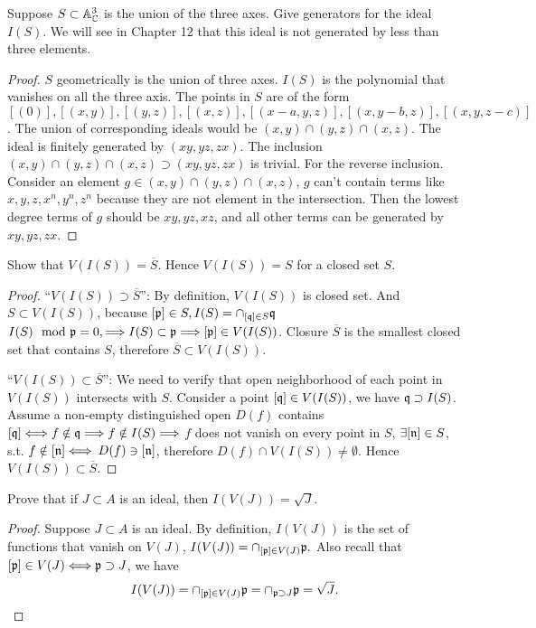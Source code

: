 \begin{exr}
Suppose $S \subset \mathbb A^3_\mathbb C$ is the union of the three axes. Give generators for the ideal $I(S)$. We will see in Chapter 12 that this ideal is not generated by less than three elements.
\end{exr}
\begin{proof}
$S$ geometrically is the union of three axes. $I(S)$ is the polynomial that vanishes on all the three axis. The points in $S$ are of the form $[(0)],[(x,y)],[(y,z)], [(x,z)],[(x-a,y,z)],[(x,y-b,z)],[(x,y,z-c)]$. The union of corresponding ideals would be $(x,y)\cap (y,z)\cap (x,z)$. The ideal is finitely generated by $(xy,yz,zx)$.
The inclusion $(x,y)\cap (y,z)\cap (x,z)\supset (xy,yz,zx)$ is trivial. For the reverse inclusion. Consider an element $g\in (x,y)\cap (y,z)\cap (x,z)$, $g$ can't contain terms like $x,y,z,x^n,y^n,z^n$ because they are not element in the intersection. Then the  lowest degree terms of $g$ should be $xy,yz,xz$, and all other terms can be generated by $xy,yz,zx$.
\end{proof}

\begin{exr}
Show that $V(I(S)) = \overline{S}$. Hence $V(I(S)) = S$ for a closed set $S$.
\end{exr}
\begin{proof}
``$V(I(S))\supset \overline{S}$'':
By definition, $V(I(S))$ is closed set. And $S\subset V(I(S))$, because $[{\mathfrak p}]\in S, I(S)=\cap_{[\mathfrak q]\in S}\mathfrak q$ $I(S)\mod {{\mathfrak p}}=0,\Longrightarrow I(S)\subset {\mathfrak p}\Longrightarrow [{\mathfrak p}]\in V(I(S))$. Closure $\overline{S}$ is the smallest closed set that contains $S$, therefore $\overline{S}\subset V(I(S))$.

 ``$V(I(S))\subset \overline{S}$'': We need to verify that open neighborhood of each point in $V(I(S))$ intersects with $S$. Consider a point $[\mathfrak q]\in V(I(S))$, we have $\mathfrak q\supset I(S)$. Assume  a non-empty distinguished open $D(f)$ contains $[\mathfrak q]\Longleftrightarrow f\notin\mathfrak q \Longrightarrow f\notin I(S)\Longrightarrow$ $f $ does not vanish on every point in $S$, $\exists[{\mathfrak n}]\in S$, s.t. $f\notin [{\mathfrak n}]\Longleftrightarrow$ $D(f)\ni [{\mathfrak n}]$, therefore $D(f)\cap V(I(S))\neq \emptyset$. Hence $V(I(S))\subset \overline{S}$.
\end{proof}

\begin{exr}
Prove that if $J \subset A$ is an ideal, then $I(V(J)) = \sqrt J$.
\end{exr}
\begin{proof}
Suppose $J\subset A$ is an ideal. By definition, $I(V(J))$ is the set of functions that vanish on $V(J)$, 
$
I(V(J))=\cap_{[{\mathfrak p}]\in V(J)}{\mathfrak p}.
$
Also recall that $[{\mathfrak p}]\in V(J)\Longleftrightarrow{\mathfrak p}\supset J$, we have
$$
I(V(J))=\cap_{[{\mathfrak p}]\in V(J)}{\mathfrak p}=\cap_{{\mathfrak p}\supset J}{\mathfrak p}=\sqrt J.
$$
\end{proof}

